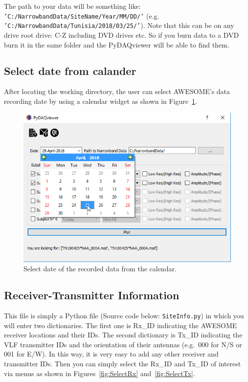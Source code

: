 \documentclass[%
oneside,                 %
final,                   %
10pt]{article}
\begin{document}
The path to your data will be something like: \texttt{'C:/NarrowbandData/SiteName/Year/MM/DD/'} (e.g. \texttt{'C:/NarrowbandData/Tunisia/2018/03/25/'}). Note that this can be on any drive root drive: C-Z including DVD drives etc. So if you burn data to a DVD burn it in the same folder and the PyDAQviewer will be able to find them.

\subsection{Select date from calander}
After locating the working directory, the user can select AWESOME's data recording date by using a calendar widget as shown in Figure~\ref{fig:SelectDate}.


\begin{figure}[!ht]  %
  \centerline{\includegraphics[width=1.0\linewidth]{imgs/SelectDate_PyDAQviewer.png}}
  \caption{
  Select date of the recorded data from the calendar. \label{fig:SelectDate}
  }
\end{figure}


\subsection{Receiver-Transmitter Information}
This file is simply a Python file (Source code below: \texttt{SiteInfo.py}) in which you will enter two dictionaries. The first one is Rx_ID indicating the AWESOME receiver locations and their IDs. The second dictionary is Tx_ID indicating the VLF transmitter IDs and the orientation of their antennas (e.g.~000 for N/S or 001 for E/W). In this way, it is very easy to add any other receiver and transmitter IDs. Then you can simply select the Rx_ID and Tx_ID of interest via menus as shown in Figures~\ref{fig:SelectRx} and~\ref{fig:SelectTx}.
\end{document}

